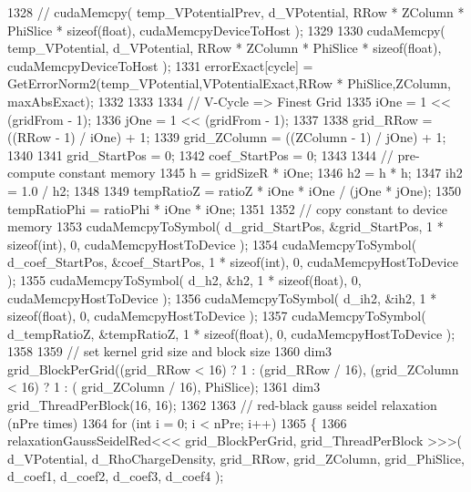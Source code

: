 \begin{DoxyCode}
1328         \textcolor{comment}{//  cudaMemcpy( temp\_VPotentialPrev, d\_VPotential, RRow * ZColumn * PhiSlice * sizeof(float),
       cudaMemcpyDeviceToHost );}
1329         
1330         cudaMemcpy( temp\_VPotential, d\_VPotential, RRow * ZColumn * PhiSlice * \textcolor{keyword}{sizeof}(\textcolor{keywordtype}{float}), 
      cudaMemcpyDeviceToHost );
1331         errorExact[cycle] = GetErrorNorm2(temp\_VPotential,VPotentialExact,RRow * PhiSlice,ZColumn,
      maxAbsExact); 
1332 
1333 
1334         \textcolor{comment}{// V-Cycle => Finest Grid}
1335         iOne = 1 << (gridFrom - 1); 
1336         jOne = 1 << (gridFrom - 1);
1337 
1338         grid\_RRow       = ((RRow - 1) / iOne) + 1;
1339         grid\_ZColumn    = ((ZColumn - 1) / jOne) + 1;
1340 
1341         grid\_StartPos = 0;
1342         coef\_StartPos = 0;
1343 
1344         \textcolor{comment}{// pre-compute constant memory}
1345         h   = gridSizeR * iOne;
1346         h2  = h * h;
1347         ih2 = 1.0 / h2;
1348 
1349         tempRatioZ = ratioZ * iOne * iOne / (jOne * jOne);
1350         tempRatioPhi = ratioPhi * iOne * iOne;
1351 
1352         \textcolor{comment}{// copy constant to device memory}
1353         cudaMemcpyToSymbol( d\_grid\_StartPos, &grid\_StartPos, 1 * \textcolor{keyword}{sizeof}(\textcolor{keywordtype}{int}), 0, cudaMemcpyHostToDevice );
1354         cudaMemcpyToSymbol( d\_coef\_StartPos, &coef\_StartPos, 1 * \textcolor{keyword}{sizeof}(\textcolor{keywordtype}{int}), 0, cudaMemcpyHostToDevice );
1355         cudaMemcpyToSymbol( d\_h2, &h2, 1 * \textcolor{keyword}{sizeof}(\textcolor{keywordtype}{float}), 0, cudaMemcpyHostToDevice );
1356         cudaMemcpyToSymbol( d\_ih2, &ih2, 1 * \textcolor{keyword}{sizeof}(\textcolor{keywordtype}{float}), 0, cudaMemcpyHostToDevice );
1357         cudaMemcpyToSymbol( d\_tempRatioZ, &tempRatioZ, 1 * \textcolor{keyword}{sizeof}(\textcolor{keywordtype}{float}), 0, cudaMemcpyHostToDevice );
1358 
1359         \textcolor{comment}{// set kernel grid size and block size}
1360         dim3 grid\_BlockPerGrid((grid\_RRow < 16) ? 1 : (grid\_RRow / 16), (grid\_ZColumn < 16) ? 1 : (
      grid\_ZColumn / 16), PhiSlice);
1361         dim3 grid\_ThreadPerBlock(16, 16);
1362 
1363         \textcolor{comment}{// red-black gauss seidel relaxation (nPre times)}
1364         \textcolor{keywordflow}{for} (\textcolor{keywordtype}{int} i = 0; i < nPre; i++)
1365         \{
1366             relaxationGaussSeidelRed<<< grid\_BlockPerGrid, grid\_ThreadPerBlock >>>( d\_VPotential, 
      d\_RhoChargeDensity, grid\_RRow, grid\_ZColumn, grid\_PhiSlice, d\_coef1, d\_coef2, d\_coef3, d\_coef4 );

\end{DoxyCode}
